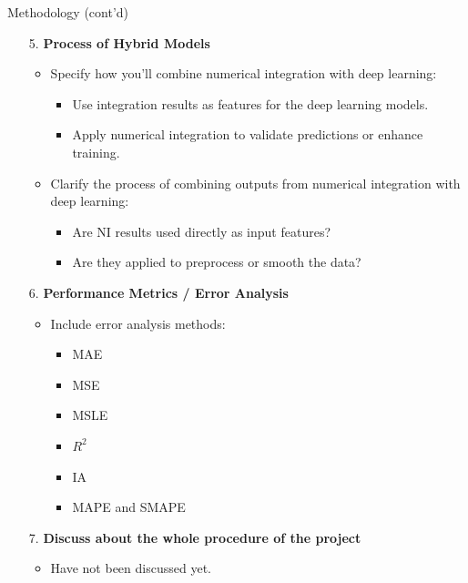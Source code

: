 \documentclass[pt]{beamer}
\newenvironment{tres important}[2][]{
	\setkeys{EmphEqEnv}{#2}
	\setkeys{EmphEqOpt}{box={\setlength{\fboxsep}{10pt}\fcolorbox{myNewColorA}{white}},#1}
	\EmphEqMainEnv}
{\endEmphEqMainEnv}
\begin{document}
\begin{frame}{Methodology (cont'd)}
\begin{itemize}
    \item[5.] \textbf{Process of Hybrid Models}
    \begin{itemize}
        \item Specify how you’ll combine numerical integration with deep learning:
        \begin{itemize}
            \item Use integration results as features for the deep learning models.
            \item Apply numerical integration to validate predictions or enhance training.
        \end{itemize}
        \item Clarify the process of combining outputs from numerical integration with deep learning:
        \begin{itemize}
            \item Are NI results used directly as input features?
            \item Are they applied to preprocess or smooth the data?
        \end{itemize}
    \end{itemize}

    \item[6.] \textbf{Performance Metrics / Error Analysis}
    \begin{itemize}
        \item Include error analysis methods:
        \begin{itemize}
            \item MAE
            \item MSE
            \item MSLE
            \item $R^2$
            \item IA
            \item MAPE and SMAPE
        \end{itemize}
    \end{itemize}

    \item[7.] \textbf{Discuss about the whole procedure of the project}
    \begin{itemize}
        \item Have not been discussed yet.
    \end{itemize}
\end{itemize}
\end{frame}
\end{document}
